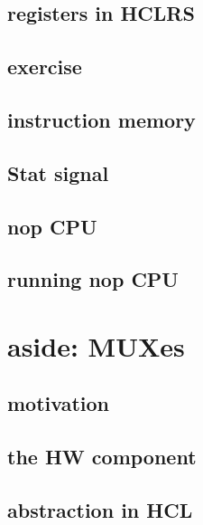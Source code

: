 \subsection{registers in HCLRS}



\subsection{exercise}



\subsection{instruction memory}



\subsection{Stat signal}



\subsection{nop CPU}


\subsection{running nop CPU}





\section{aside: MUXes}
\subsection{motivation}
\subsection{the HW component}


\subsection{abstraction in HCL}


